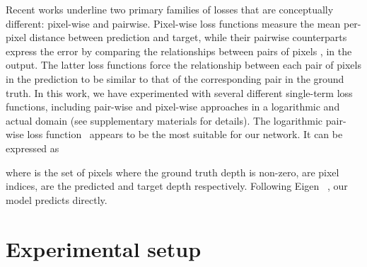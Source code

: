 \documentclass[final]{cvpr}
\begin{document}
    Recent works underline two primary families of losses that are conceptually different: pixel-wise and pairwise. Pixel-wise loss functions measure the mean per-pixel distance between prediction and target, while their pairwise counterparts express the error by comparing the relationships between pairs of pixels ,  in the output. The latter loss functions force the relationship between each pair of pixels in the prediction to be similar to that of the corresponding pair in the ground truth. In this work, we have experimented with several different single-term loss functions, including pair-wise and pixel-wise approaches in a logarithmic and actual domain (see supplementary materials for details). The logarithmic  pair-wise loss function~\cite{romanov2020general} appears to be the most suitable for our network. It can be expressed as

where  is the set of pixels where the ground truth depth is non-zero,  are pixel indices,  are the predicted and target depth respectively. Following Eigen \etal~\cite{eigen_fergus}, our model predicts  directly.
    
    \section{Experimental setup}\label{sec:experiments}
\end{document}
